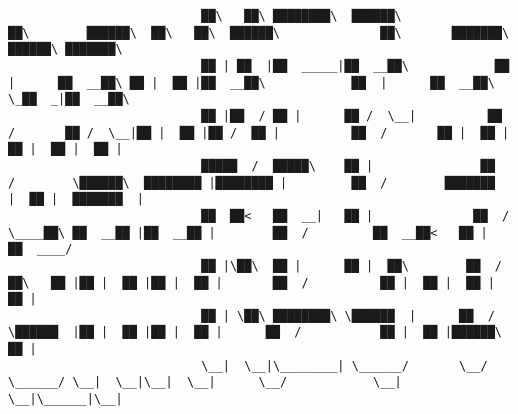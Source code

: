 \documentclass[varwidth=\maxdimen,margin=0.5cm,multi={verbatim}]{standalone}
\begin{document}
\begin{verbatim}
                           ██\   ██\ ████████\  ██████\              ██\        ██████\  ██\   ██\  ██████\              ██\       ███████\  ██████\ ███████\  
                           ██ | ██  |██  _____|██  __██\            ██  |      ██  __██\ ██ |  ██ |██  __██\            ██  |      ██  __██\ \_██  _|██  __██\ 
                           ██ |██  / ██ |      ██ /  \__|          ██  /       ██ /  \__|██ |  ██ |██ /  ██ |          ██  /       ██ |  ██ |  ██ |  ██ |  ██ |
                           █████  /  █████\    ██ |               ██  /        \██████\  ████████ |████████ |         ██  /        ███████  |  ██ |  ███████  |
                           ██  ██<   ██  __|   ██ |              ██  /          \____██\ ██  __██ |██  __██ |        ██  /         ██  __██<   ██ |  ██  ____/ 
                           ██ |\██\  ██ |      ██ |  ██\        ██  /          ██\   ██ |██ |  ██ |██ |  ██ |       ██  /          ██ |  ██ |  ██ |  ██ |      
                           ██ | \██\ ████████\ \██████  |      ██  /           \██████  |██ |  ██ |██ |  ██ |      ██  /           ██ |  ██ |██████\ ██ |      
                           \__|  \__|\________| \______/       \__/             \______/ \__|  \__|\__|  \__|      \__/            \__|  \__|\______|\__|




\end{verbatim}
\end{document}
